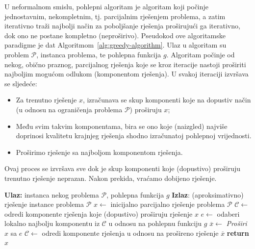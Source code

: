 U neformalnom smislu, pohlepni algoritam je algoritam koji počinje jedno\-stavnim, nekompletnim, tj. parcijalnim rješenjem problema, a zatim iterativno traži najbolji način za poboljšanje rješenja proširujući ga iterativno, dok ono ne postane kompletno (neproširivo). Pseudokod ove algoritamske paradigme je dat Algoritmom~\ref{alg:greedy-algorithm}. Ulaz u algoritam su problem $\mathcal{P}$, instanca problema, te pohlepna funkcija $g$.  Algoritam počinje od nekog, obično praznog, parcijalnog rješenja koje se kroz iteracije nastoji proširiti najboljim mogućom odlukom (komponentom rješenja). U svakoj iteraciji izvršava se sljedeće:
 \begin{itemize}
 	\item Za trenutno rješenje $x$, izračunava se skup komponenti koje na dopustiv način (u odnosu na ograničenja problema $\mathcal{P}$) proširuju $x$;
 	\item Među svim takvim komponentama, bira se ono koje (naizgled) najviše doprinosi kvalitetu krajnjeg rješenja shodno izračunatoj pohlepnoj vrije\-dnosti. %
 	\item Proširimo rješenje sa najboljom komponentom rješenja.
 \end{itemize}
Ovaj proces se izvršava sve dok je skup komponenti koje (dopustivo) proširuju trenutno rješenje neprazan. Nakon prekida, vraćamo dobijeno rješenje. \\ 


\begin{algorithm}
	\begin{algorithmic}[1]
		\State \textbf{Ulaz:}   instanca nekog problema $\mathcal{P}$, pohlepna funkcija $g$
		\State \textbf{Izlaz}: (aproksimativno) rješenje instance problema $\mathcal{P}$
		\State $x\gets$ inicijalno parcijalno rješenje problema $\mathcal{P}$
		\State $\mathcal{C}\gets$ odredi komponente rješenja koje (dopustivo) proširuju rješenje $x$
		    \State $e \gets$ odaberi lokalno najbolju komponentu iz $\mathcal{C}$ u odnosu na pohlepnu funkciju $g$
		    \State $\overline{x} \gets$ \textit{Proširi} $x$ sa $e$
		     \State $\mathcal{C}\gets$ odredi komponente rješenja u odnosu na prošireno rješenje $ \overline{x} $
		\EndWhile
		   \State \textbf{return} $x$
	\end{algorithmic}

    \caption{Shema paradigme pohlepnih algoritama.}    \label{alg:greedy-algorithm}
\end{algorithm}

